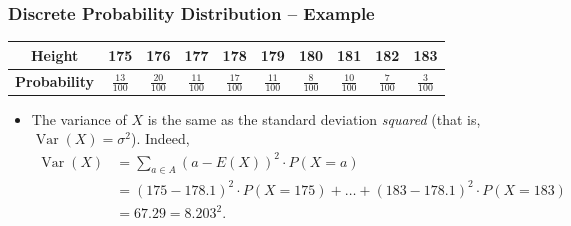 \documentclass[aspectratio=169,11pt,usenames,dvipsnames]{beamer}
\DeclareMathOperator{\var}{Var}
\begin{document}
\begin{frame}
 \frametitle{Discrete Probability Distribution -- Example}
 \begin{center}
  \begin{tabular}{c|ccccccccc}
   \textbf{Height} & 175 & 176 & 177 & 178 & 179 & 180 & 181 & 182 & 183\\
   \midrule
   \textbf{Probability} & $\frac{13}{100}$ & $\frac{20}{100}$ & $\frac{11}{100}$
                        & $\frac{17}{100}$ & $\frac{11}{100}$ & $\frac{8}{100}$
                        & $\frac{10}{100}$ & $\frac{7}{100}$ & $\frac{3}{100}$
  \end{tabular}
 \end{center}
 \begin{itemize}
  \item The \alert{variance} of $X$ is the same as the standard deviation
   \emph{squared} (that is, $\var(X) = \sigma^2$). Indeed,
   \begin{align*}
    \var(X) &= \sum_{a \in A} (a - E(X))^2 \cdot P(X = a)\\
            &= (175 - 178.1)^2 \cdot P(X = 175) + \ldots + (183 - 178.1)^2 \cdot
            P(X = 183)\\
            &= 67.29 = 8.203^2.
   \end{align*}
 \end{itemize}
\end{frame}
\end{document}
